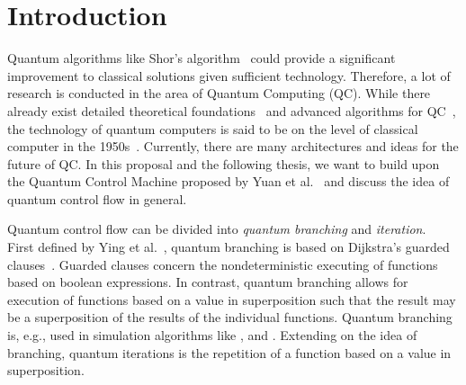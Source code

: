 \chapter{Introduction}

Quantum algorithms like Shor's algorithm~\cite{Shor97} could provide a significant improvement to classical solutions given sufficient technology. Therefore, a lot of research is conducted in the area of Quantum Computing (QC). While there already exist detailed theoretical foundations~\cite{van20, Ying11,YYF12} and advanced algorithms for QC~\cite{ACR*10,BGB*18,LoCh19,Shor97}, the technology of quantum computers is said to be on the level of classical computer in the 1950s~\cite{CFM17}. Currently, there are many architectures and ideas for the future of QC. In this proposal and the following thesis, we want to build upon the Quantum Control Machine proposed by Yuan et al.~\cite{YVC24} and discuss the idea of quantum control flow in general.

Quantum control flow can be divided into \emph{quantum branching} and \emph{iteration}.~\cite{YVC24} First defined by Ying et al.~\cite{YYF12}, quantum branching is based on Dijkstra's guarded clauses~\cite{Dijk75}. Guarded clauses concern the nondeterministic executing of functions based on boolean expressions. In contrast, quantum branching allows for execution of functions based on a value in superposition such that the result may be a superposition of the results of the individual functions. Quantum branching is, e.g., used in simulation algorithms like \cite{BGB*18}, and \cite{LoCh19}. Extending on the idea of branching, quantum iterations is the repetition of a function based on a value in superposition. 

